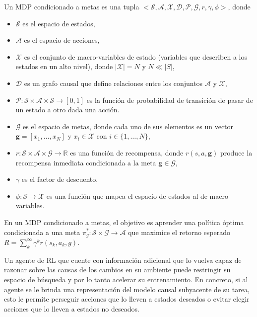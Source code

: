     Un MDP condicionado a metas es
una tupla $<\mathcal{S}, \mathcal{A}, \mathcal{X},
\mathcal{D}, \mathcal{P}, \mathcal{G}, r, \gamma, \phi>$, donde 
\begin{itemize}
    \item $\mathcal{S}$ es el espacio de estados, 
    \item $\mathcal{A}$ es el espacio de acciones, 
    \item $\mathcal{X}$ es el conjunto de
    macro-variables de estado \cite{chalupka2014visual} (variables 
    que describen a los estados en un alto nivel), donde $|\mathcal{X}| = N$ y
    $N \ll |S|$,
    \item $\mathcal{D}$ es un grafo causal
    que define relaciones entre
    los conjuntos $\mathcal{A}$ y $\mathcal{X}$, 
    \item $\mathcal{P}: \mathcal{S} \times \mathcal{A} \times \mathcal{S} \rightarrow [0, 1]
     $ es la función de probabilidad de transición de pasar de un estado a otro dada una acción. 
    \item $\mathcal{G}$ es el espacio de metas, donde cada uno de sus elementos es un vector $\mathbf{g} = [x_1, \dots, x_N]$ y $x_i \in \mathcal{X}$
    con $i \in \{1, \dots, N\}$,
    \item $r : \mathcal{S} \times \mathcal{A} \times \mathcal{G} \rightarrow \mathbb{R}$ es una función
de recompensa, donde $r(s, a, \mathbf{g})$ produce la recompensa inmediata condicionada a la meta $\mathbf{g} \in \mathcal{G}$,
\item $\gamma$ es el factor de descuento,
\item $\phi : \mathcal{S} \rightarrow \mathcal{X}$ es una función que mapea el espacio de estados al de macro-variables.
\end{itemize}

En un MDP condicionado a metas, el objetivo es aprender una 
política óptima condicionada a una meta $\pi^*_g: \mathcal{S} \times \mathcal{G} \rightarrow \mathcal{A}$ que maximice el retorno esperado $R = \sum_{k}^{\infty}\gamma^{k} r(s_k, a_k, g)$.

Un agente de RL que cuente con información adicional que lo vuelva 
capaz de razonar sobre las causas de los cambios en su ambiente 
puede restringir su espacio de búsqueda y
por lo tanto acelerar su entrenamiento.
En concreto, si al agente se le brinda una representación del modelo
causal subyacente de su tarea, esto le permite perseguir acciones que lo lleven a
estados deseados o evitar elegir acciones que lo lleven a 
estados no deseados.

